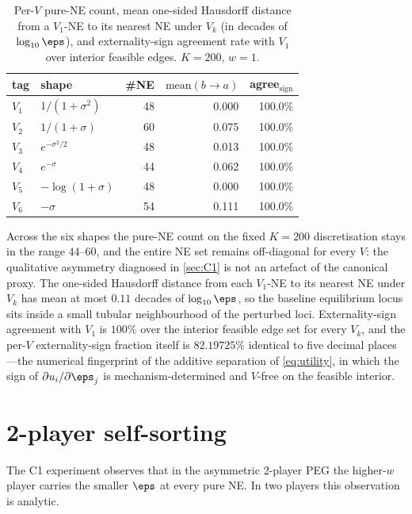 \begin{table}[t]
  \centering
  \small
  \begin{tabular}{l l r r r}
    \toprule
    tag & shape & \#NE & $\mathrm{mean}(b\!\to\!a)$ & agree$_{\mathrm{sign}}$ \\
    \midrule
    $V_1$ & $1/(1+\sigma^2)$   & 48 & 0.000 & 100.0\% \\
    $V_2$ & $1/(1+\sigma)$     & 60 & 0.075 & 100.0\% \\
    $V_3$ & $e^{-\sigma^2/2}$  & 48 & 0.013 & 100.0\% \\
    $V_4$ & $e^{-\sigma}$      & 44 & 0.062 & 100.0\% \\
    $V_5$ & $-\log(1+\sigma)$  & 48 & 0.000 & 100.0\% \\
    $V_6$ & $-\sigma$          & 54 & 0.111 & 100.0\% \\
    \bottomrule
  \end{tabular}
  \caption{Per-$V$ pure-NE count, mean one-sided Hausdorff distance from
    a $V_1$-NE to its nearest NE under $V_k$ (in decades of
    $\log_{10}\eps$), and externality-sign agreement rate with $V_1$
    over interior feasible edges. $K = 200$, $w = 1$.}
  \label{tab:H5-v-shape}
\end{table}

Across the six shapes the pure-NE count on the fixed $K = 200$
discretisation stays in the range $44\text{--}60$, and the entire NE
set remains off-diagonal for every $V$: the qualitative asymmetry
diagnosed in \cref{sec:C1} is not an artefact of the canonical proxy.
The one-sided Hausdorff distance from each $V_1$-NE to its nearest NE
under $V_k$ has mean at most $0.11$ decades of $\log_{10}\eps$, so the
baseline equilibrium locus sits inside a small tubular neighbourhood of
the perturbed loci. Externality-sign agreement with $V_1$ is $100\%$
over the interior feasible edge set for every $V_k$, and the per-$V$
externality-sign fraction itself is $82.19725\%$ identical to five
decimal places---the numerical fingerprint of the additive separation of
\eqref{eq:utility}, in which the sign of $\partial u_i / \partial \eps_j$
is mechanism-determined and $V$-free on the feasible interior.

\section{2-player self-sorting}
\label{app:self-sorting}

The C1 experiment observes that in the asymmetric 2-player PEG the
higher-$w$ player carries the smaller $\eps$ at every pure NE. In two
players this observation is analytic.


